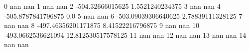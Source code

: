 0 nan nan
1 nan nan
2 -504.32666015625 1.5521240234375
3 nan nan
4 -505.8787841796875 0.0
5 nan nan
6 -503.09039306640625 2.78839111328125
7 nan nan
8 -497.46356201171875 8.41522216796875
9 nan nan
10 -493.0662536621094 12.812530517578125
11 nan nan
12 nan nan
13 nan nan
14 nan nan

